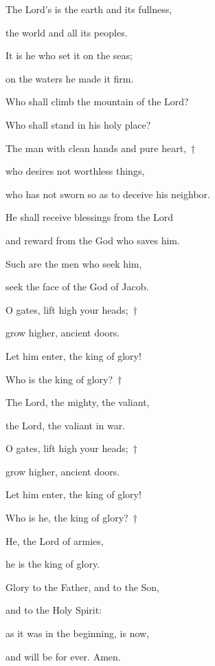 \noindent The Lord’s is the earth and its fullness,~\GreStar{}~\nopagebreak

the world and all its peoples.

\noindent It is he who set it on the seas;~\GreStar{}~\nopagebreak

on the waters he made it firm.

\noindent Who shall climb the mountain of the Lord?~\GreStar{}~\nopagebreak

Who shall stand in his holy place?

\noindent The man with clean hands and pure heart,~†~\nopagebreak

who desires not worthless things,~\GreStar{}~\nopagebreak

who has not sworn so as to deceive his neighbor.

\noindent He shall receive blessings from the Lord~\GreStar{}~\nopagebreak

and reward from the God who saves him.

\noindent Such are the men who seek him,~\GreStar{}~\nopagebreak

seek the face of the God of Jacob.

\noindent O gates, lift high your heads;~†~\nopagebreak

grow higher, ancient doors.~\GreStar{}~\nopagebreak

Let him enter, the king of glory!

\noindent Who is the king of glory?~†~\nopagebreak

The Lord, the mighty, the valiant,~\GreStar{}~\nopagebreak

the Lord, the valiant in war.

\noindent O gates, lift high your heads;~†~\nopagebreak

grow higher, ancient doors.~\GreStar{}~\nopagebreak

Let him enter, the king of glory!

\noindent Who is he, the king of glory?~†~\nopagebreak

He, the Lord of armies,~\GreStar{}~\nopagebreak

he is the king of glory.

\noindent Glory to the Father, and to the Son,~\GreStar{}~\nopagebreak

and to the Holy Spirit:

\noindent as it was in the beginning, is now,~\GreStar{}~\nopagebreak

and will be for ever. Amen.
